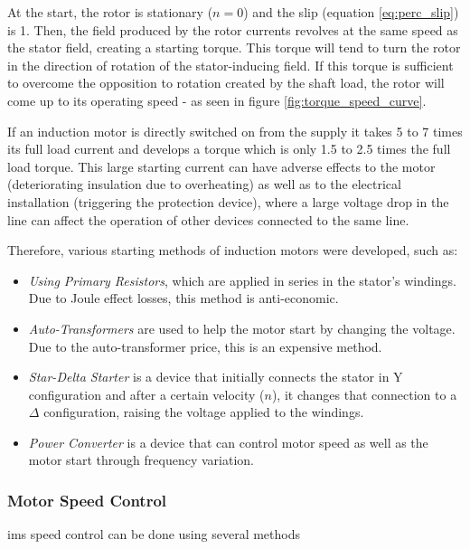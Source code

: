 At the start, the rotor is stationary ($n = 0$) and the slip (equation \ref{eq:perc_slip}) is 1. Then, the field produced by the rotor currents revolves at the same speed as the stator field, creating a starting torque. 
This torque will tend to turn the rotor in the direction of rotation of the stator-inducing field. If this torque is sufficient to overcome the opposition to rotation created by the shaft load, the rotor will come up to its operating speed - as seen in figure \ref{fig:torque_speed_curve}.

If an induction motor is directly switched on from the supply it takes 5 to 7 times its full load current and develops a torque which is only 1.5 to 2.5 times the full load torque. 
This large starting current can have adverse effects to the motor (deteriorating insulation due to overheating) as well as to the electrical installation (triggering the protection device), where a large voltage drop in the line can affect the operation of other devices connected to the same line.

Therefore, various starting methods of induction motors were developed, such as:

\begin{itemize}
  \item 
  \emph{Using Primary Resistors}, which are applied in series in the stator's windings. Due to Joule effect losses, this method is anti-economic.
  \item 
  \emph{Auto-Transformers} are used to help the motor start by changing the voltage. Due to the auto-transformer price, this is an expensive method.
  \item 
  \emph{Star-Delta Starter} is a device that initially connects the stator in Y configuration and after a certain velocity ($n$), it changes that connection to a $\Delta$ configuration, raising the voltage applied to the windings.
  \item 
  \emph{Power Converter} is a device that can control motor speed as well as the motor start through frequency variation.
\end{itemize}

\subsubsection{Motor Speed Control}
\acrshort{ims} speed control can be done using several methods

